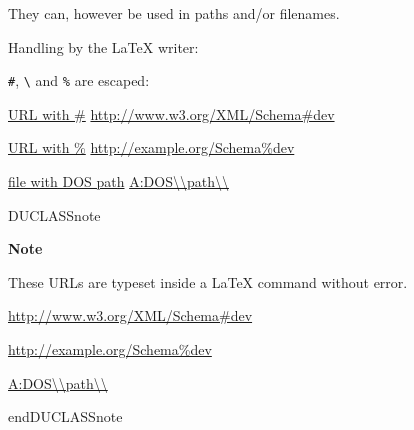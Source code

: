 \documentclass[a4paper]{article}
\newenvironment{DUclass}[1]%
  {%
   \def\DocutilsClassFunctionName{DUCLASS#1}
     \csname \DocutilsClassFunctionName \endcsname}%
  {\csname end\DocutilsClassFunctionName \endcsname}%
\newenvironment{DUadmonition}%
  {\begin{center}
     \begin{lrbox}{\DUadmonitionbox}
       \begin{minipage}{0.9\linewidth}
  }%
  {    \end{minipage}
     \end{lrbox}
     \fbox{\usebox{\DUadmonitionbox}}
   \end{center}
  }
\newenvironment{DUlineblock}[1]{%
    \list{}{\setlength{\partopsep}{\parskip}
            \addtolength{\partopsep}{\baselineskip}
            \setlength{\topsep}{0pt}
            \setlength{\itemsep}{0.15\baselineskip}
            \setlength{\parsep}{0pt}
            \setlength{\leftmargin}{#1}}
    \raggedright
  }
  {\endlist}
\providecommand*{\DUtitle}[1]{%
  \smallskip\noindent\textbf{#1}\smallskip}
\begin{document}
They can, however be used in paths and/or filenames.

Handling by the LaTeX writer:

\begin{itemize}
\item \texttt{\#}, \texttt{\textbackslash{}} and \texttt{\%} are escaped:

\begin{DUlineblock}{0em}
\item[] \href{http://www.w3.org/XML/Schema\#dev}{URL with \#}
\url{http://www.w3.org/XML/Schema\#dev}
\item[] \href{http://www.w3.org/XML/Schema\%dev}{URL with \%}
\url{http://example.org/Schema\%dev}
\item[] \href{A:DOS\\path\\}{file with DOS path} \url{A:DOS\\path\\}
\end{DUlineblock}

\begin{DUclass}{note}
\begin{DUadmonition}
\DUtitle{Note}

These URLs are typeset inside a LaTeX command without error.

\begin{DUlineblock}{0em}
\item[] \url{http://www.w3.org/XML/Schema\#dev}
\item[] \url{http://example.org/Schema\%dev}
\item[] \url{A:DOS\\path\\}
\end{DUlineblock}
\end{DUadmonition}
\end{DUclass}
\end{itemize}
\end{document}
